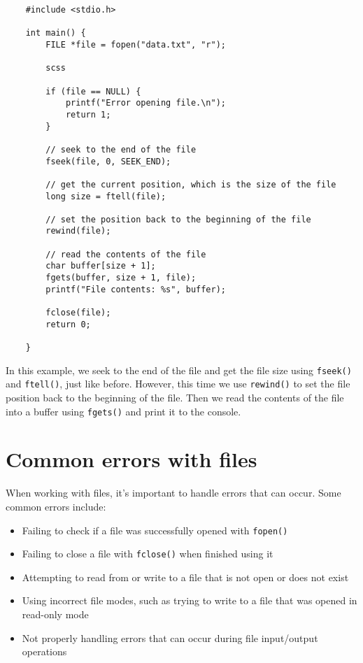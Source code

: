 \begin{verbatim}
	#include <stdio.h>
	
	int main() {
		FILE *file = fopen("data.txt", "r");
		
		scss
		
		if (file == NULL) {
			printf("Error opening file.\n");
			return 1;
		}
		
		// seek to the end of the file
		fseek(file, 0, SEEK_END);
		
		// get the current position, which is the size of the file
		long size = ftell(file);
		
		// set the position back to the beginning of the file
		rewind(file);
		
		// read the contents of the file
		char buffer[size + 1];
		fgets(buffer, size + 1, file);
		printf("File contents: %s", buffer);
		
		fclose(file);
		return 0;
		
	}
\end{verbatim}

In this example, we seek to the end of the file and get the file size using {\tt fseek()} and {\tt ftell()}, just like before. However, this time we use {\tt rewind()} to set the file position back to the beginning of the file. Then we read the contents of the file into a buffer using {\tt fgets()} and print it to the console.

\section{Common errors with files}

When working with files, it's important to handle errors that can occur. Some common errors include:

\begin{itemize}
	\item Failing to check if a file was successfully opened with {\tt fopen()}
	\item Failing to close a file with {\tt fclose()} when finished using it
	\item Attempting to read from or write to a file that is not open or does not exist
	\item Using incorrect file modes, such as trying to write to a file that was opened in read-only mode
	\item Not properly handling errors that can occur during file input/output operations
\end{itemize}

